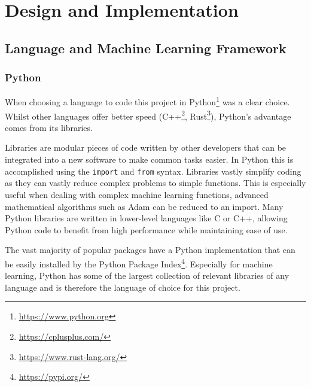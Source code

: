 \chapter{Design and Implementation}
\label{ch:design-implementation}

\section{Language and Machine Learning Framework}


\subsection{Python}

When choosing a language to code this project in Python\footnote{\url{https://www.python.org}} was a clear choice. Whilst other languages offer better speed (C++\footnote{\url{https://cplusplus.com/}}, Rust\footnote{\url{https://www.rust-lang.org/}}), Python's advantage comes from its libraries.

Libraries are modular pieces of code written by other developers that can be integrated into a new software to make common tasks easier. In Python this is accomplished using the \verb|import| and \verb|from| syntax. Libraries vastly simplify coding as they can vastly reduce complex problems to simple functions. This is especially useful when dealing with complex machine learning functions, advanced mathematical algorithms such as Adam can be reduced to an import. Many Python libraries are written in lower-level languages like C or C++, allowing Python code to benefit from high performance while maintaining ease of use.

The vast majority of popular packages have a Python implementation that can be easily installed by the Python Package Index\footnote{\url{https://pypi.org/}}. Especially for machine learning, Python has some of the largest collection of relevant libraries of any language and is therefore the language of choice for this project.

